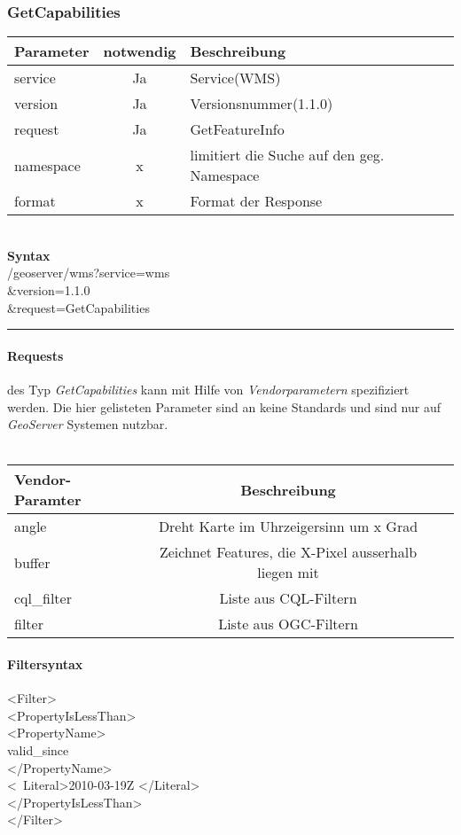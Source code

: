 \subsubsection{GetCapabilities}
\begin{tabular}{lcl}
\textbf{Parameter} & \textbf{notwendig} & \textbf{Beschreibung}\\
\hline 
service & Ja & Service(WMS) \\ 
\hline 
version & Ja & Versionsnummer(1.1.0) \\ 
\hline 
request & Ja & GetFeatureInfo \\ 
\hline 
namespace & x &  limitiert die Suche auf den geg. Namespace\\
\hline
format & x & Format der Response\\
\hline
\end{tabular}\\

\textbf{Syntax}\\
/geoserver/wms?service=wms\\
\&version=1.1.0\\
\&request=GetCapabilities\\
\hrule
\paragraph{Requests}
des Typ \emph{GetCapabilities} kann mit Hilfe von \emph{Vendorparametern} spezifiziert werden. Die hier gelisteten Parameter sind an keine Standards und sind nur auf \emph{GeoServer} Systemen nutzbar.\\\\
\begin{tabular}{lcl}
\textbf{Vendor-Paramter} & \textbf{Beschreibung} \\
\hline 
angle  & Dreht Karte im Uhrzeigersinn um x Grad\\ 
\hline 
buffer  & Zeichnet Features, die X-Pixel ausserhalb liegen mit  \\ 
\hline 
cql\_filter &  Liste aus CQL-Filtern \\
\hline
filter & Liste aus OGC-Filtern \\
\hline

\end{tabular} 
\paragraph{Filtersyntax\\}
\textless Filter\textgreater\\
    \textless PropertyIsLessThan\textgreater\\
        \textless PropertyName\textgreater\\
            valid\_since\\
        \textless/PropertyName\textgreater\\
        \textless\ Literal\textgreater 2010-03-19Z \textless/Literal\textgreater\\
    \textless/PropertyIsLessThan\textgreater\\
\textless/Filter\textgreater\\

